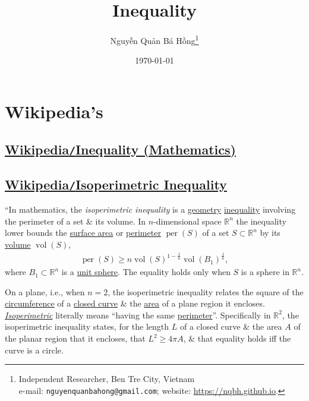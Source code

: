 \documentclass[oneside]{book}
\title{Inequality}
\author{\selectlanguage{vietnamese} Nguyễn Quản Bá Hồng\footnote{Independent Researcher, Ben Tre City, Vietnam\\e-mail: \texttt{nguyenquanbahong@gmail.com}; website: \url{https://nqbh.github.io}.}}
\date{\today}
\numberwithin{equation}{section}
\begin{document}
\maketitle
\setcounter{secnumdepth}{4}
\setcounter{tocdepth}{4}
\tableofcontents


\chapter{Wikipedia's}

\section{\href{https://en.wikipedia.org/wiki/Inequality_(mathematics)}{Wikipedia\texttt{/}Inequality (Mathematics)}}


\section{\href{https://en.wikipedia.org/wiki/Isoperimetric_inequality}{Wikipedia\texttt{/}Isoperimetric Inequality}}
``In mathematics, the \textit{isoperimetric inequality} is a \href{https://en.wikipedia.org/wiki/Geometry}{geometry} \href{https://en.wikipedia.org/wiki/Inequality_(mathematics)}{inequality} involving the perimeter of a set \& its volume. In $n$-dimensional space $\mathbb{R}^n$ the inequality lower bounds the \href{https://en.wikipedia.org/wiki/Surface_area}{surface area} or \href{https://en.wikipedia.org/wiki/Perimeter}{perimeter} $\operatorname{per}(S)$ of a set $S\subset\mathbb{R}^n$ by its \href{https://en.wikipedia.org/wiki/Volume}{volume} $\operatorname{vol}(S)$,
\begin{align*}
	\operatorname{per}(S)\ge n\operatorname{vol}(S)^{1 - \frac{1}{n}}\operatorname{vol}(B_1)^{\frac{1}{n}},
\end{align*}
where $B_1\subset\mathbb{R}^n$ is a \href{https://en.wikipedia.org/wiki/Unit_sphere}{unit sphere}. The equality holds only when $S$ is a sphere in $\mathbb{R}^n$.

On a plane, i.e., when $n = 2$, the isoperimetric inequality relates the square of the \href{https://en.wikipedia.org/wiki/Circumference}{circumference} of a \href{https://en.wikipedia.org/wiki/Closed_curve}{closed curve} \& the \href{https://en.wikipedia.org/wiki/Area}{area} of a plane region it encloses. \href{https://en.wiktionary.org/wiki/isoperimetric#English}{\textit{Isoperimetric}} literally means ``having the same \href{https://en.wikipedia.org/wiki/Perimeter}{perimeter}''. Specifically in $\mathbb{R}^2$, the isoperimetric inequality states, for the length $L$ of a closed curve \& the area $A$ of the planar region that it encloses, that $L^2\ge 4\pi A$, \& that equality holds iff the curve is a circle.
\end{document}
